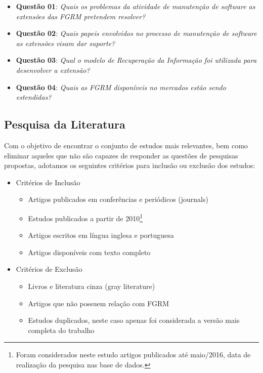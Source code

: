 
\begin{itemize}
	\item \textbf{Questão 01}: \textit{Quais os problemas da atividade de
			manutenção de software as extensões das FGRM pretendem resolver?}
	\item \textbf{Questão 02}: \textit{Quais papeis envolvidos no processo de
			manutenção de software as extensões visam dar suporte?}
	\item \textbf{Questão 03}: \textit{Qual o modelo de Recuperação da
			Informação foi utilizada para desenvolver a extensão?}
	\item \textbf{Questão 04}: \textit{Quais as FGRM disponíveis no mercados
			estão sendo estendidas?}

\end{itemize}

\subsection{Pesquisa da Literatura}
\label{subsec:map-pesquisa-literatura}

Com o objetivo de encontrar o conjunto de estudos mais relevantes, bem como
eliminar aqueles que não são capazes de responder as questões de pesquisas
propostas, adotamos os seguintes critérios para inclusão ou exclusão dos
estudos:

\begin{itemize}
	\item Critérios de Inclusão
		\begin{itemize}
			 \item Artigos publicados em conferências e periódicos (journals)
			 \item Estudos publicados a partir de 2010\footnote{Foram
					 considerados neste estudo artigos publicados até maio/2016,
					 data de realização da pesquisa nas base de dados.}
			 \item Artigos escritos em língua inglesa e portuguesa
			 \item Artigos disponíveis com texto completo
		\end{itemize}
	\item Critérios de Exclusão
		\begin{itemize}
			\item Livros e literatura cinza (gray literature)
			\item Artigos que não possuem relação com FGRM
			\item Estudos duplicados, neste caso apenas foi considerada a versão
				mais completa do trabalho
		\end{itemize}
\end{itemize}

